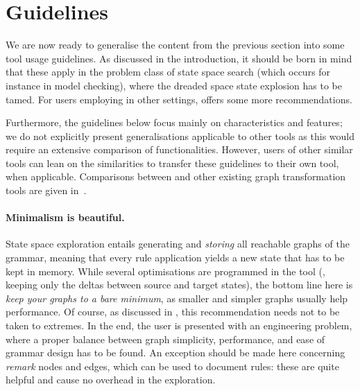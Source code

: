
\section{Guidelines}

We are now ready to generalise the content from the previous section into some
tool usage guidelines. As discussed in the introduction, it should be born in
mind that these apply in the problem class of state space search (which occurs
for instance in model checking), where the dreaded space state explosion has to
be tamed. For users employing \GROOVE in other settings, \cite{GMR+12} offers
some more recommendations.

Furthermore, the guidelines below focus mainly on \GROOVE characteristics and
features; we do not explicitly present generalisations applicable to other
tools as this would require an extensive comparison of
functionalities. However, users of other similar tools can lean on the
similarities to transfer these guidelines to their own tool, when
applicable. Comparisons between \GROOVE and other existing graph
transformation tools are given in~\cite{GMR+12,Jakumeit+2013}.

\vspace{-\medskipamount}
\paragraph{Minimalism is beautiful.} State space exploration entails generating
and \emph{storing} all reachable graphs of the grammar, meaning that every
rule application yields a new state that has to be kept in memory. While
several optimisations are programmed in the tool (\eg, keeping only the deltas
between source and target states), the bottom line here is \emph{keep your
graphs to a bare minimum}, as smaller and simpler graphs usually help
performance. Of course, as discussed in , this recommendation
needs not to be taken to extremes. In the end, the user is presented with an
engineering problem, where a proper balance between graph simplicity,
performance, and ease of grammar design has to be found.
%
An exception should be made here concerning \emph{remark} nodes and edges,
which can be used to document rules: these are quite helpful and cause no
overhead in the exploration.

